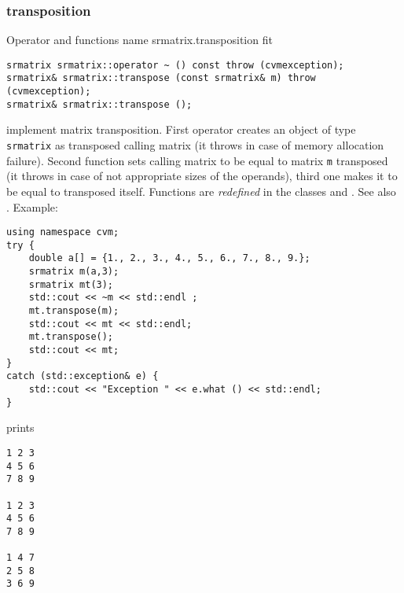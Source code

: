 \subsubsection{transposition}
Operator and functions%
\pdfdest name {srmatrix.transposition} fit
\begin{verbatim}
srmatrix srmatrix::operator ~ () const throw (cvmexception);
srmatrix& srmatrix::transpose (const srmatrix& m) throw (cvmexception);
srmatrix& srmatrix::transpose ();
\end{verbatim}
implement matrix transposition.
First operator creates an object of type \verb"srmatrix" as
 transposed calling matrix
(it throws  
in case of memory allocation failure). 
Second function sets  calling matrix to be equal to  matrix
\verb"m" transposed
(it throws  
in case of not appropriate sizes of the operands), 
third one makes it to be equal to
transposed itself. 
Functions are \emph{redefined} in the classes
and .
See also .
Example:
\begin{Verbatim}
using namespace cvm;
try {
    double a[] = {1., 2., 3., 4., 5., 6., 7., 8., 9.};
    srmatrix m(a,3);
    srmatrix mt(3);
    std::cout << ~m << std::endl ;
    mt.transpose(m);
    std::cout << mt << std::endl;
    mt.transpose();
    std::cout << mt;
}
catch (std::exception& e) {
    std::cout << "Exception " << e.what () << std::endl;
}
\end{Verbatim}
prints
\begin{Verbatim}
1 2 3
4 5 6
7 8 9

1 2 3
4 5 6
7 8 9

1 4 7
2 5 8
3 6 9
\end{Verbatim}
\newpage



